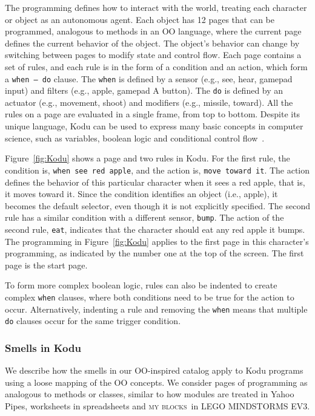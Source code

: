 \documentclass{sig-alternate}
\newcommand{\ms}{LEGO MINDSTORMS EV3}
\newcommand{\mbs}{\textsc{my blocks}}
\begin{document}
The programming defines how to interact with the world, treating each character or object as an autonomous agent. Each object has 12 pages that can be programmed, analogous to methods in an OO language, where the current page defines the current behavior of the object. 
The object's behavior can change by switching between pages to modify state and control flow. 
Each page contains a set of rules, and each rule is in the form of a condition and an action, which form a {\tt when~--~do} clause. The {\tt when} is defined by a sensor (e.g., see, hear, gamepad input) and filters (e.g., apple, gamepad A button). The {\tt do} is defined by an actuator (e.g., movement, shoot) and modifiers (e.g., missile, toward). All the rules on a page are evaluated in a single frame, from top to bottom. 
Despite its unique language, Kodu  can be used to express many basic concepts in computer science, such as variables, boolean logic and conditional control flow~\cite{Stolee:2011:ECS:1953163.1953197}. 

Figure~\ref{fig:Kodu} shows a page and two rules  in Kodu. For the first rule, the condition is, {\tt when see red apple}, and the action is, {\tt move toward it}. The action defines the behavior of this particular character when it sees a red apple, that is, it moves toward it. Since the condition identifies an object (i.e., apple), it becomes the default selector, even though it is not explicitly specified. The second rule has a similar condition with a different sensor, {\tt bump}. The action of the second rule, {\tt eat}, indicates that the character should eat any red apple it bumps. 
The programming in Figure~\ref{fig:Kodu} applies to the first page in this character's programming, as indicated by the number one at the top of the screen. The first page is the  start page.

To form more complex boolean logic, rules can also be indented to create complex {\tt when} clauses, where both conditions need to be true for the action to occur. Alternatively, indenting a rule and removing the {\tt when} means that multiple {\tt do} clauses occur for the same trigger condition. 

\subsubsection{Smells in Kodu}
We describe how the smells in our OO-inspired catalog apply to Kodu programs using a loose mapping of the OO concepts. We consider pages of programming as analogous to methods or classes, similar to how modules are treated in Yahoo Pipes, worksheets in spreadsheets and \mbs~in \ms. 
\end{document}
